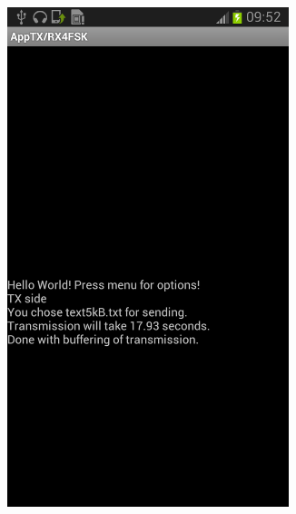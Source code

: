 \documentclass[12pt,a4paper,openright]{report}
\begin{document}
\begin{figure}[H]
 \centering
 \begin{subfigure}{.3\textwidth}
 \centering
    \includegraphics[width=0.9\textwidth]{transmitFSKonline.png}
    \label{fig:appTXsideFSK}
    \end{subfigure}%
 \begin{subfigure}{.3\textwidth}
  	 \centering

\end{subfigure}
\end{figure}
\end{document}
